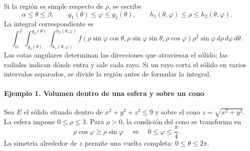 Si la región es simple respecto de $\rho$, se escribe
\[
\alpha\leq\theta\leq\beta,\qquad
g_1(\theta)\leq\varphi\leq g_2(\theta),\qquad
h_1(\theta,\varphi)\leq\rho\leq h_2(\theta,\varphi).
\]
La integral correspondiente es
\[
\int_\alpha^\beta\int_{g_1(\theta)}^{g_2(\theta)}
\int_{h_1(\theta,\varphi)}^{h_2(\theta,\varphi)}
f(\rho\sin\varphi\cos\theta,\rho\sin\varphi\sin\theta,\rho\cos\varphi)
\rho^2\sin\varphi\,d\rho\,d\varphi\,d\theta.
\]
Las cotas angulares determinan las direcciones que atraviesan el sólido; las radiales indican dónde entra y sale cada rayo. Si un rayo corta el sólido en varios intervalos separados, se divide la región antes de formular la integral.

\paragraph{Ejemplo 1. Volumen dentro de una esfera y sobre un cono}

Sea $E$ el sólido situado dentro de $x^2+y^2+z^2\leq9$ y sobre el cono $z=\sqrt{x^2+y^2}$. La esfera impone $0\leq\rho\leq3$. Para $\rho>0$, la condición del cono se transforma en
\[
\rho\cos\varphi\geq\rho\sin\varphi
\quad\Longleftrightarrow\quad 0\leq\varphi\leq\frac\pi4.
\]
La simetría alrededor de $z$ permite una vuelta completa: $0\leq\theta\leq2\pi$.

